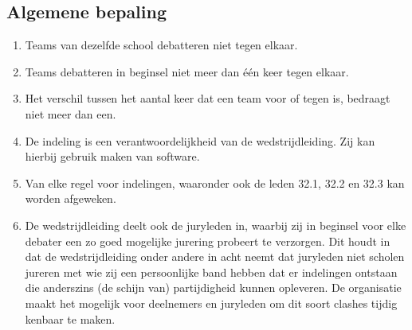 \subsection{Algemene bepaling}

\begin{enumerate}
\item Teams van dezelfde school debatteren niet tegen elkaar.
\item Teams debatteren in beginsel niet meer dan één keer tegen elkaar. 
\item Het verschil tussen het aantal keer dat een team voor of tegen is, bedraagt niet meer dan een.
\item De indeling is een verantwoordelijkheid van de wedstrijdleiding. Zij kan hierbij gebruik maken van software.
\item Van elke regel voor indelingen, waaronder ook de leden 32.1, 32.2 en 32.3 kan worden afgeweken. 
\item De wedstrijdleiding deelt ook de juryleden in, waarbij zij in beginsel voor elke debater een zo goed mogelijke jurering probeert te verzorgen. Dit houdt in dat de wedstrijdleiding onder andere in acht neemt dat juryleden niet scholen jureren met wie zij een persoonlijke band hebben dat er indelingen ontstaan die anderszins (de schijn van) partijdigheid kunnen opleveren. De organisatie maakt het mogelijk voor deelnemers en juryleden om dit soort clashes tijdig kenbaar te maken. 
\end{enumerate}
